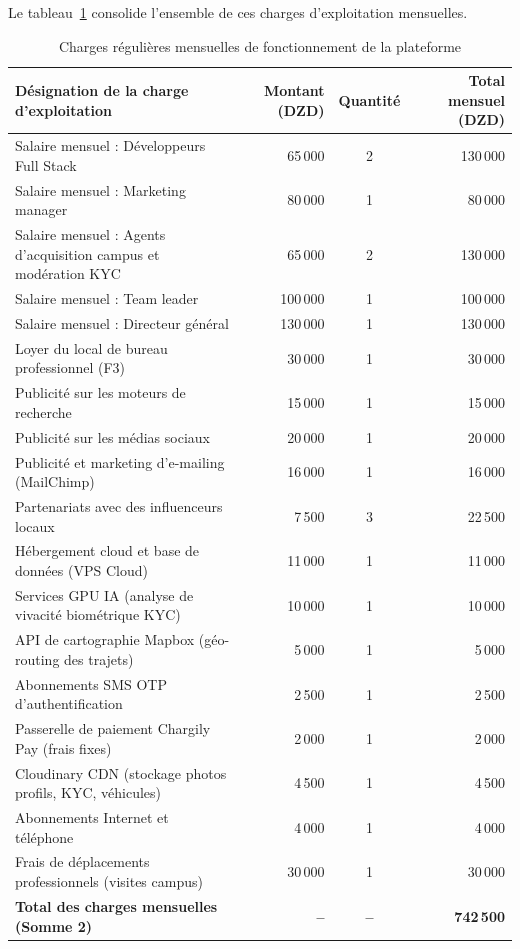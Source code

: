 Le tableau~\ref{tab:depenses} consolide l'ensemble de ces charges d'exploitation mensuelles.

\begin{table}[H]
\centering
\small
\begin{tabularx}{\textwidth}{|X|r|c|r|}
\hline
\rowcolor{rohlight}
\textbf{Désignation de la charge d'exploitation} & \textbf{Montant (DZD)} & \textbf{Quantité} & \textbf{Total mensuel (DZD)} \\
\hline
Salaire mensuel : Développeurs Full Stack & 65\,000 & 2 & 130\,000 \\
\hline
Salaire mensuel : Marketing manager & 80\,000 & 1 & 80\,000 \\
\hline
Salaire mensuel : Agents d'acquisition campus et modération KYC & 65\,000 & 2 & 130\,000 \\
\hline
Salaire mensuel : Team leader & 100\,000 & 1 & 100\,000 \\
\hline
Salaire mensuel : Directeur général & 130\,000 & 1 & 130\,000 \\
\hline
Loyer du local de bureau professionnel (F3) & 30\,000 & 1 & 30\,000 \\
\hline
Publicité sur les moteurs de recherche & 15\,000 & 1 & 15\,000 \\
\hline
Publicité sur les médias sociaux & 20\,000 & 1 & 20\,000 \\
\hline
Publicité et marketing d'e-mailing (MailChimp) & 16\,000 & 1 & 16\,000 \\
\hline
Partenariats avec des influenceurs locaux & 7\,500 & 3 & 22\,500 \\
\hline
Hébergement cloud et base de données (VPS Cloud) & 11\,000 & 1 & 11\,000 \\
\hline
Services GPU IA (analyse de vivacité biométrique KYC) & 10\,000 & 1 & 10\,000 \\
\hline
API de cartographie Mapbox (géo-routing des trajets) & 5\,000 & 1 & 5\,000 \\
\hline
Abonnements SMS OTP d'authentification & 2\,500 & 1 & 2\,500 \\
\hline
Passerelle de paiement Chargily Pay (frais fixes) & 2\,000 & 1 & 2\,000 \\
\hline
Cloudinary CDN (stockage photos profils, KYC, véhicules) & 4\,500 & 1 & 4\,500 \\
\hline
Abonnements Internet et téléphone & 4\,000 & 1 & 4\,000 \\
\hline
Frais de déplacements professionnels (visites campus) & 30\,000 & 1 & 30\,000 \\
\hline
\rowcolor{rohlight}
\textbf{Total des charges mensuelles (Somme 2)} & \textbf{--} & \textbf{--} & \textbf{742\,500} \\
\hline
\end{tabularx}
  \caption{Charges régulières mensuelles de fonctionnement de la plateforme}
  \label{tab:depenses}
\end{table}


